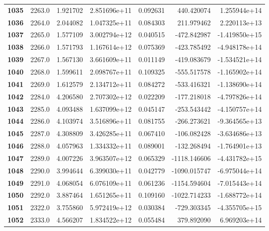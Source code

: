 \documentclass{report}[12pt]
\begin{document}
\begin{center}
\begin{tabular}{lrrrrrr}
\textbf{1035} &         2263.0 &   1.921702 &  2.851696e+11 &    0.092631 &   440.420074 &  1.255944e+14 \\
\textbf{1036} &         2264.0 &   2.044082 &  1.047325e+11 &    0.084303 &   211.979462 &  2.220113e+13 \\
\textbf{1037} &         2265.0 &   1.577109 &  3.002794e+12 &    0.040515 &  -472.842987 & -1.419850e+15 \\
\textbf{1038} &         2266.0 &   1.571793 &  1.167614e+12 &    0.075369 &  -423.785492 & -4.948178e+14 \\
\textbf{1039} &         2267.0 &   1.567130 &  3.661609e+11 &    0.011149 &  -419.083679 & -1.534521e+14 \\
\textbf{1040} &         2268.0 &   1.599611 &  2.098767e+11 &    0.109325 &  -555.517578 & -1.165902e+14 \\
\textbf{1041} &         2269.0 &   1.612579 &  2.134712e+11 &    0.084272 &  -533.416321 & -1.138690e+14 \\
\textbf{1042} &         2284.0 &   4.206580 &  2.707302e+12 &    0.022209 &  -177.218018 & -4.797826e+14 \\
\textbf{1043} &         2285.0 &   4.093488 &  1.637099e+12 &    0.045147 &  -253.543442 & -4.150757e+14 \\
\textbf{1044} &         2286.0 &   4.103974 &  3.516896e+11 &    0.081755 &  -266.273621 & -9.364565e+13 \\
\textbf{1045} &         2287.0 &   4.308809 &  3.426285e+11 &    0.067410 &  -106.082428 & -3.634686e+13 \\
\textbf{1046} &         2288.0 &   4.057963 &  1.334332e+11 &    0.089001 &  -132.268494 & -1.764901e+13 \\
\textbf{1047} &         2289.0 &   4.007226 &  3.963507e+12 &    0.065329 & -1118.146606 & -4.431782e+15 \\
\textbf{1048} &         2290.0 &   3.994644 &  6.399030e+11 &    0.042779 & -1090.015747 & -6.975044e+14 \\
\textbf{1049} &         2291.0 &   4.068054 &  6.076109e+11 &    0.061236 & -1154.594604 & -7.015443e+14 \\
\textbf{1050} &         2292.0 &   3.887464 &  1.651265e+11 &    0.109160 & -1022.714233 & -1.688772e+14 \\
\textbf{1051} &         2322.0 &   3.755860 &  5.972419e+12 &    0.030384 &  -729.303345 & -4.355705e+15 \\
\textbf{1052} &         2333.0 &   4.566207 &  1.834522e+12 &    0.055484 &   379.892090 &  6.969203e+14 \\

\end{tabular}
\end{center}
\end{document}
